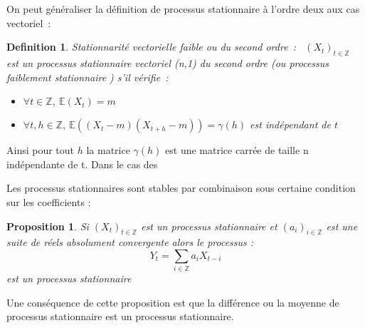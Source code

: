 \documentclass[11pt]{scrartcl} %
\newtheorem{Def}[theorem]{Definition}
\newtheorem{pro}[theorem]{Proposition}
\newcommand{\Xt}{\left(X_t\right)_{t\in\mathbb{Z}}}
\newcommand{\E}[1]{\mathbb{E}\left(#1\right)}
\begin{document}
On peut généraliser la définition de processus stationnaire à l'ordre deux aux cas vectoriel~:
\begin{Def}\label{staFaibleVec}
Stationnarité vectorielle faible ou du second ordre~:~
$\left(X_t\right)_{t\in\mathbb{Z}}$ est un processus stationnaire vectoriel (n,1) du second ordre (ou processus faiblement stationnaire ) s'il vérifie~:
\begin{itemize}
\item[i)]$\forall t\in\mathbb{Z},~\mathbb{E}\left(X_t\right)=m $ 
\item[ii)]$\forall t,h\in\mathbb{Z},~\E{(X_t-m)(X_{t+h}-m)}=\gamma\left(h\right) $ est indépendant de $t$ 
\end{itemize}
\end{Def} 
Ainsi pour tout $h$ la matrice $\gamma(h)$ est une matrice carrée de taille n indépendante de t. Dans le cas des 

Les processus stationnaires sont stables par combinaison sous certaine condition sur les coefficients : 
\begin{pro}
Si $\Xt$ est un processus stationnaire et $(a_i)_{i\in \mathbb{Z}}$ est une suite de réels absolument convergente alors le processus : 
$$
Y_t=\sum_{i\in\mathbb{Z}}a_i X_{t-i}
$$
est un processus stationnaire
\end{pro}
Une conséquence de cette proposition est que la différence ou la moyenne de processus stationnaire est un processus stationnaire.
\end{document}
